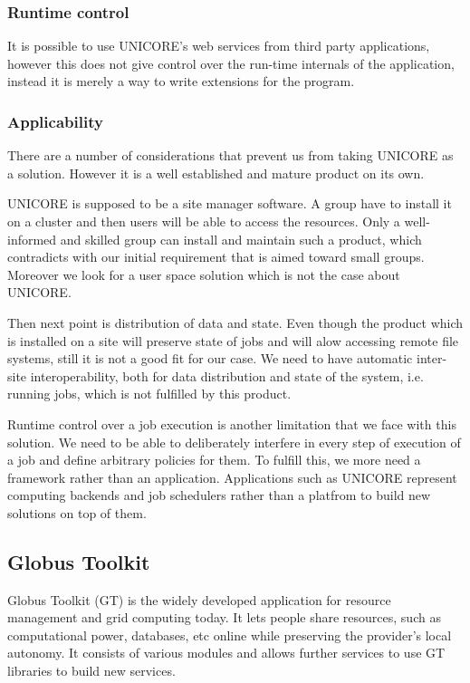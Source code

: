 \subsubsection {Runtime control}
It is possible to use UNICORE's web services from third party applications, however this does 
not give control over the run-time internals of the application, instead it is merely a way 
to write extensions for the program.
\subsubsection {Applicability}
There are a number of considerations that prevent us from taking UNICORE as a solution. However
it is a well established and mature product on its own.

UNICORE is supposed to be a site manager software. A group have to install it on a cluster and
then users will be able to access the resources. Only a well-informed and skilled group can 
install and maintain such a product, which contradicts with our initial requirement that is 
aimed toward small groups. Moreover we look for a user space solution which is not the case
about UNICORE.

Then next point is distribution of data and state. Even though the product which is installed
on a site will preserve state of jobs and will alow accessing remote file systems, still it is
not a good fit for our case. We need to have automatic inter-site interoperability, both for
data distribution and state of the system, i.e. running jobs, which is not fulfilled by this
product.

Runtime control over a job execution is another limitation that we face with this solution.
We need to be able to deliberately interfere in every step of execution of a job and define 
arbitrary policies for them. To fulfill this, we more need a framework rather than an application.
Applications such as UNICORE represent computing backends and job schedulers rather than a 
platfrom to build new solutions on top of them.

\subsection{Globus Toolkit}
Globus Toolkit (GT) is the widely developed application for resource management and grid computing today.\cite{eickermann2005steering}
It lets people share resources, such as computational power, databases, etc online while preserving the
provider's local autonomy. It consists of various modules and allows further services
to use GT libraries to build new services.\cite{foster2005network}

